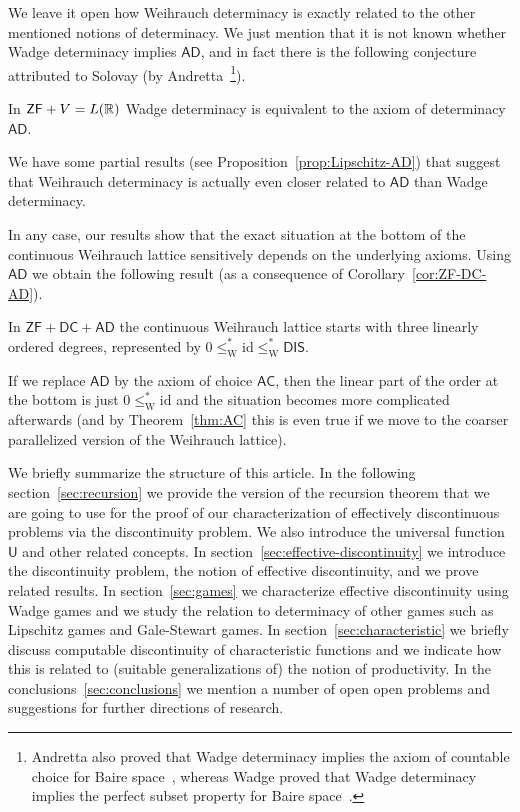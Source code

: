 \documentclass{amsart}
\def\IR{{\Bbb{R}}}
\def\U{{\mathsf{{U}}}}
\def\id{{\mathrm{id}}}
\def\DIS{\mathsf{DIS}}
\def\AC{\mathsf{AC}}
\def\AD{\mathsf{AD}}
\def\ZF{\mathsf{ZF}}
\def\DC{\mathsf{DC}}
\begin{document}
We leave it open how Weihrauch determinacy is exactly related to the other mentioned notions of determinacy. 
We just mention that it is not known whether Wadge determinacy implies $\AD$, and in fact there is 
the following conjecture attributed to Solovay (by Andretta~\cite{And03}\footnote{Andretta also proved that Wadge determinacy implies the axiom of countable choice for Baire space~\cite[Theorem~3]{And03}, whereas Wadge proved that 
Wadge determinacy implies the perfect subset property for Baire space~\cite[Theorem~II.C.2]{Wad83}.}).

\begin{conjecture}[Solovay]
In $\ZF+V=L(\IR)$ Wadge determinacy is equivalent to the axiom of determinacy $\AD$.
\end{conjecture}

We have some partial results (see Proposition~\ref{prop:Lipschitz-AD}) that suggest that Weihrauch determinacy
is actually even closer related to $\AD$ than Wadge determinacy.

In any case, our results show that the exact situation at the bottom of the continuous Weihrauch lattice 
sensitively depends on the underlying axioms. Using $\AD$ we obtain the following result (as a consequence of Corollary~\ref{cor:ZF-DC-AD}).

\begin{theorem}
\label{thm:bottom}
In $\ZF+\DC+\AD$ the continuous Weihrauch lattice starts with three linearly ordered degrees, represented by
$0\leq_\mathrm{W}^*\id\leq_\mathrm{W}^*\DIS$.
\end{theorem}

If we replace $\AD$ by the axiom of choice $\AC$, then the linear part of the order at the bottom is just $0\leq_\mathrm{W}^*\id$
and the situation becomes more complicated afterwards (and  by Theorem~\ref{thm:AC} this is even true if we move to the coarser parallelized version of the Weihrauch lattice).

We briefly summarize the structure of this article. In the following section~\ref{sec:recursion} we 
provide the version of the recursion theorem that we are going to use for the proof of our characterization 
of effectively discontinuous problems via the discontinuity problem.
We also introduce the universal function $\U$ and other related concepts.
In section~\ref{sec:effective-discontinuity} we introduce the discontinuity problem, the notion of effective discontinuity,
and we prove related results. In section~\ref{sec:games} we characterize effective discontinuity using Wadge games
and we study the relation to determinacy of other games such as Lipschitz games and Gale-Stewart games.
In section~\ref{sec:characteristic} we briefly discuss computable discontinuity of characteristic functions and we indicate
how this is related to (suitable generalizations of) the notion of productivity.
In the conclusions~\ref{sec:conclusions} we mention a number of open open problems and suggestions
for further directions of research.
\end{document}
